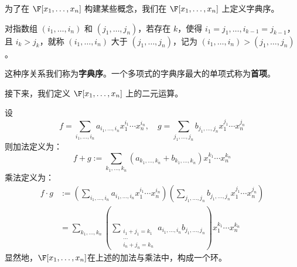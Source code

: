 为了在 \( \F[x_1,\dots,x_n] \) 构建某些概念，我们在 \( \F[x_1,\dots,x_n] \) 上定义字典序。
\begin{definition}
	对指数组 \( (i_1,\dots,i_n) \) 和 \( (j_1,\dots,j_n) \)，若存在 \( k \)，使得 \( i_1=j_1,\dots,i_{k-1}=j_{k-1} \)，且 \( i_k>j_k \)，就称 \( (i_1,\dots,i_n) \) 大于 \( (j_1,\dots,j_n) \)，记为 \( (i_1,\dots,i_n) > (j_1,\dots,j_n) \)。
	
	这种序关系我们称为\textbf{字典序}。一个多项式的字典序最大的单项式称为\textbf{首项}。
	
\end{definition}


接下来，我们定义 \( \F[x_1,\dots,x_n] \) 上的二元运算。

\begin{definition}
	设
	\[
	f = \sum_{i_1,\dots,i_n} a_{i_1,\dots,i_n} x_1^{i_1} \cdots x_n^{i_n}, \quad g = \sum_{j_1,\dots,j_n} b_{j_1,\dots,j_n} x_1^{j_1} \cdots x_n^{j_n}
	\]
	则加法定义为：
	\[
	f+g := \sum_{k_1,\dots,k_n} (a_{k_1,\dots,k_n} + b_{k_1,\dots,k_n}) x_1^{k_1} \cdots x_n^{k_n}
	\]
	乘法定义为：
	\[
	\begin{aligned}
		f \cdot g &:= \left( \sum_{i_1,\dots,i_n} a_{i_1,\dots,i_n} x_1^{i_1} \cdots x_n^{i_n} \right) \left( \sum_{j_1,\dots,j_n} b_{j_1,\dots,j_n} x_1^{j_1} \cdots x_n^{j_n} \right) \\
		&= \sum_{k_1,\dots,k_n} \left( \sum_{\substack{i_1+j_1=k_1 \\ \dots \\ i_n+j_n=k_n}} a_{i_1,\dots,i_n} b_{j_1,\dots,j_n} \right) x_1^{k_1} \cdots x_n^{k_n}
	\end{aligned}
	\]
	显然地，\( \F[x_1,\dots,x_n] \)在上述的加法与乘法中，构成一个环。
\end{definition}

